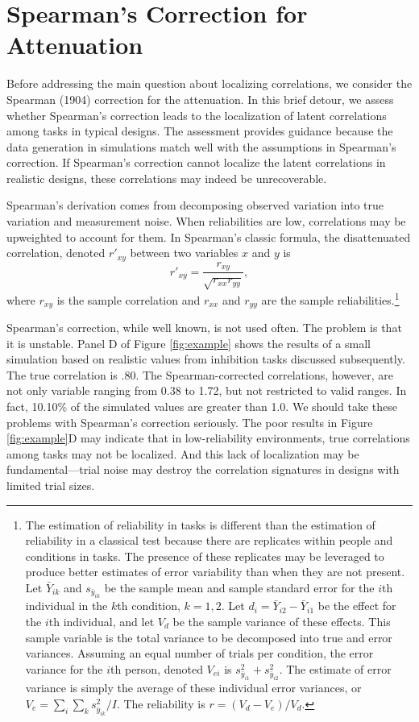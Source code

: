 \documentclass[
  ,man]{apa6}
\begin{document}
\hypertarget{spearmans-correction-for-attenuation}{%
\section{Spearman's Correction for Attenuation}\label{spearmans-correction-for-attenuation}}

Before addressing the main question about localizing correlations, we consider the Spearman (1904) correction for the attenuation. In this brief detour, we assess whether Spearman's correction leads to the localization of latent correlations among tasks in typical designs. The assessment provides guidance because the data generation in simulations match well with the assumptions in Spearman's correction. If Spearman's correction cannot localize the latent correlations in realistic designs, these correlations may indeed be unrecoverable.

Spearman's derivation comes from decomposing observed variation into true variation and measurement noise. When reliabilities are low, correlations may be upweighted to account for them. In Spearman's classic formula, the disattenuated correlation, denoted \(r'_{xy}\) between two variables \(x\) and \(y\) is
\[
r'_{xy} = \frac{r_{xy}}{\sqrt{r_{xx}r_{yy}}},
\]
where \(r_{xy}\) is the sample correlation and \(r_{xx}\) and \(r_{yy}\) are the sample reliabilities.\footnote{The estimation of reliability in tasks is different than the estimation of reliability in a classical test because there are replicates within people and conditions in tasks. The presence of these replicates may be leveraged to produce better estimates of error variability than when they are not present. Let \(\bar{Y}_{ik}\) and \(s_{\bar{y}_{ik}}\) be the sample mean and sample standard error for the \(i\)th individual in the \(k\)th condition, \(k=1,2\). Let \(d_{i}=\bar{Y}_{i2}-\bar{Y}_{i1}\) be the effect for the \(i\)th individual, and let \(V_d\) be the sample variance of these effects. This sample variable is the total variance to be decomposed into true and error variances. Assuming an equal number of trials per condition, the error variance for the \(i\)th person, denoted \(V_{ei}\) is \(s^2_{\bar{y}_{i1}}+s^2_{\bar{y}_{i2}}\). The estimate of error variance is simply the average of these individual error variances, or \(V_e=\sum_i\sum_k s_{\bar{y}_{ik}}^2/I\). The reliability is \(r=(V_d-V_e)/V_d\).}

Spearman's correction, while well known, is not used often. The problem is that it is unstable. Panel D of Figure \ref{fig:example} shows the results of a small simulation based on realistic values from inhibition tasks discussed subsequently. The true correlation is .80. The Spearman-corrected correlations, however, are not only variable ranging from 0.38 to 1.72, but not restricted to valid ranges. In fact, 10.10\% of the simulated values are greater than 1.0. We should take these problems with Spearman's correction seriously. The poor results in Figure \ref{fig:example}D may indicate that in low-reliability environments, true correlations among tasks may not be localized. And this lack of localization may be fundamental---trial noise may destroy the correlation signatures in designs with limited trial sizes.
\end{document}
